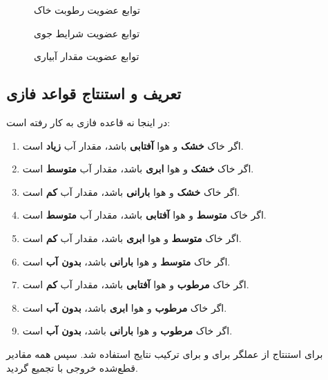 \documentclass[a4paper,12pt]{article}
\begin{document}
	\begin{figure}[h]
		\centering
		\caption{توابع عضویت رطوبت خاک}
	\end{figure}
	
	\begin{figure}[h]
		\centering
		\caption{توابع عضویت شرایط جوی}
	\end{figure}
	
	\begin{figure}[h]
		\centering
		\caption{توابع عضویت مقدار آبیاری}
	\end{figure}
	
	\subsection{تعریف و استنتاج قواعد فازی}
	در اینجا نه قاعده فازی به کار رفته است:
	\begin{enumerate}
		\item اگر خاک \textbf{خشک} و هوا \textbf{آفتابی} باشد، مقدار آب \textbf{زیاد} است.
		\item اگر خاک \textbf{خشک} و هوا \textbf{ابری} باشد، مقدار آب \textbf{متوسط} است.
		\item اگر خاک \textbf{خشک} و هوا \textbf{بارانی} باشد، مقدار آب \textbf{کم} است.
		\item اگر خاک \textbf{متوسط} و هوا \textbf{آفتابی} باشد، مقدار آب \textbf{متوسط} است.
		\item اگر خاک \textbf{متوسط} و هوا \textbf{ابری} باشد، مقدار آب \textbf{کم} است.
		\item اگر خاک \textbf{متوسط} و هوا \textbf{بارانی} باشد، \textbf{بدون آب} است.
		\item اگر خاک \textbf{مرطوب} و هوا \textbf{آفتابی} باشد، مقدار آب \textbf{کم} است.
		\item اگر خاک \textbf{مرطوب} و هوا \textbf{ابری} باشد، \textbf{بدون آب} است.
		\item اگر خاک \textbf{مرطوب} و هوا \textbf{بارانی} باشد، \textbf{بدون آب} است.
	\end{enumerate}
	
	برای استنتاج از عملگر  برای  و  برای ترکیب نتایج استفاده شد. سپس همه مقادیر قطع‌شده خروجی با  تجمیع گردید.
	
\end{document}
